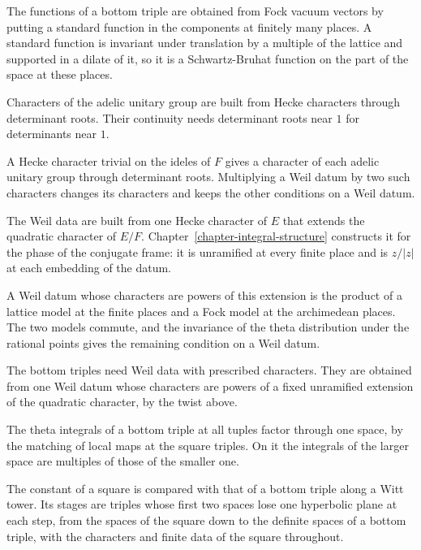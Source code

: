 The functions of a bottom triple are obtained from Fock vacuum vectors by putting a standard function in
the components at finitely many places. A standard function is invariant under translation by a
multiple of the lattice and supported in a dilate of it, so it is a Schwartz-Bruhat function on the part
of the space at these places.

Characters of the adelic unitary group are built from Hecke characters through determinant roots. Their
continuity needs determinant roots near $1$ for determinants near $1$.

A Hecke character trivial on the ideles of $F$ gives a character of each adelic unitary group through
determinant roots. Multiplying a Weil datum by two such characters changes its characters and keeps the
other conditions on a Weil datum.

The Weil data are built from one Hecke character of $E$ that extends the quadratic character of $E/F$.
Chapter~\ref{chapter-integral-structure} constructs it for the phase of the conjugate frame: it is unramified at every finite place and is $z/|z|$ at each
embedding of the datum.

A Weil datum whose characters are powers of this extension is the product of a lattice model at the finite
places and a Fock model at the archimedean places. The two models commute, and the invariance of the theta
distribution under the rational points gives the remaining condition on a Weil datum.

The bottom triples need Weil data with prescribed characters. They are obtained from one Weil datum whose
characters are powers of a fixed unramified extension of the quadratic character, by the twist above.

The theta integrals of a bottom triple at all tuples factor through one space, by the matching of local
maps at the square triples. On it the integrals of the larger space are multiples of those of the
smaller one.

The constant of a square is compared with that of a bottom triple along a Witt tower. Its stages are
triples whose first two spaces lose one hyperbolic plane at each step, from the spaces of the square down to
the definite spaces of a bottom triple, with the characters and finite data of the square throughout.

